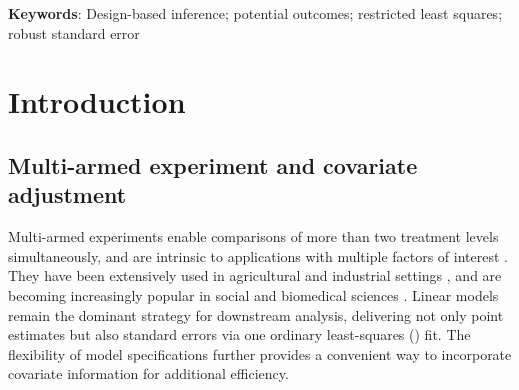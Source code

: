 \documentclass[11pt]{article}
\theoremstyle{definition}
\begin{document}
\medskip 
\noindent 
{\bf Keywords}: Design-based inference; potential outcomes; restricted  least squares; robust standard error


\newpage
 






\section{Introduction}


\subsection{Multi-armed experiment and covariate adjustment}
\label{sec::experiment+covariates}

Multi-armed experiments enable comparisons of more than two treatment levels simultaneously, and are intrinsic to applications with multiple factors of interest {\citep[see, e.g.,][]{cb, cdl, rahul}.}
%
They have been extensively used in agricultural and industrial settings \citep[see, e.g.,][]{box, wh}, and are becoming increasingly popular in social and biomedical sciences \citep[see, e.g., ][]{duflo, karlan2014,  jens, imai, alsan, torres, blackwell}. 
Linear models remain the dominant strategy for downstream analysis, delivering not only point estimates but also standard errors via one ordinary least-squares (\ols) fit. The flexibility of model specifications further provides a convenient way to incorporate covariate information for additional efficiency. 
\end{document}
